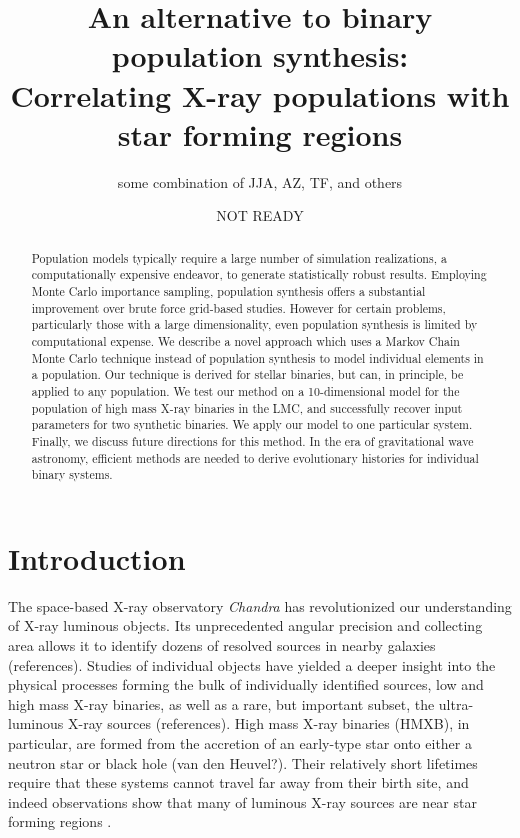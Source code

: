 \documentclass[12pt, preprint]{aastex}
\begin{document}
\title{An alternative to binary population synthesis: \\ Correlating X-ray populations with star forming regions}
\author{some combination of JJA, AZ, TF, and others}
\date{NOT READY}

\begin{abstract}
Population models typically require a large number of simulation realizations, a computationally expensive endeavor, to generate statistically robust results. Employing Monte Carlo importance sampling, population synthesis offers a substantial improvement over brute force grid-based studies. However for certain problems, particularly those with a large dimensionality, even population synthesis is limited by computational expense. We describe a novel approach which uses a Markov Chain Monte Carlo technique instead of population synthesis to model individual elements in a population. Our technique is derived for stellar binaries, but can, in principle, be applied to any population. We test our method on a 10-dimensional model for the population of high mass X-ray binaries in the LMC, and successfully recover input parameters for two synthetic binaries. We apply our model to one particular system. Finally, we discuss future directions for this method. In the era of gravitational wave astronomy, efficient methods are needed to derive evolutionary histories for individual binary systems.
\end{abstract}





\section{Introduction}


The space-based X-ray observatory {\it Chandra} has revolutionized our understanding of X-ray luminous objects. Its unprecedented angular precision and collecting area allows it to identify dozens of resolved sources in nearby galaxies (references). Studies of individual objects have yielded a deeper insight into the physical processes forming the bulk of individually identified sources, low and high mass X-ray binaries, as well as a rare, but important subset, the ultra-luminous X-ray sources (references). High mass X-ray binaries (HMXB), in particular, are formed from the accretion of an early-type star onto either a neutron star or black hole (van den Heuvel?). Their relatively short lifetimes require that these systems cannot travel far away from their birth site, and indeed observations show that many of luminous X-ray sources are near star forming regions \citep{zezas02, kaaret04}. 
\end{document}
